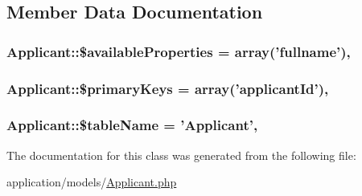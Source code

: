 \subsection{Member Data Documentation}
\hypertarget{class_applicant_ab7f7b5b72a33bef87ac8c297affec119}{
\subsubsection[{\$available\-Properties}]{\setlength{\rightskip}{0pt plus 5cm}Applicant\-::\$available\-Properties = array('fullname')\hspace{0.3cm}{\ttfamily [static]}, {\ttfamily [protected]}}}\label{class_applicant_ab7f7b5b72a33bef87ac8c297affec119}
\hypertarget{class_applicant_a0557a06061d1147f125169282c73c8d1}{
\subsubsection[{\$primary\-Keys}]{\setlength{\rightskip}{0pt plus 5cm}Applicant\-::\$primary\-Keys = array('applicant\-Id')\hspace{0.3cm}{\ttfamily [static]}, {\ttfamily [protected]}}}\label{class_applicant_a0557a06061d1147f125169282c73c8d1}
\hypertarget{class_applicant_a9d77c56e6d97260988e8ffae590ccd9f}{
\subsubsection[{\$table\-Name}]{\setlength{\rightskip}{0pt plus 5cm}Applicant\-::\$table\-Name = '{\bf Applicant}'\hspace{0.3cm}{\ttfamily [static]}, {\ttfamily [protected]}}}\label{class_applicant_a9d77c56e6d97260988e8ffae590ccd9f}


The documentation for this class was generated from the following file\-:\begin{DoxyCompactItemize}
\item 
application/models/\hyperlink{_applicant_8php}{Applicant.\-php}\end{DoxyCompactItemize}

